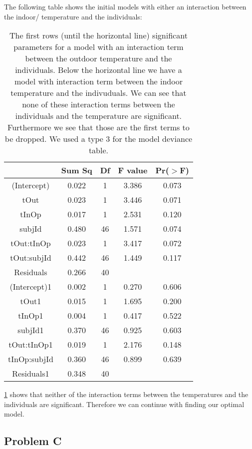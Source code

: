 \documentclass[
]{article}
\begin{document}
The following table shows the initial models with either an interaction
between the indoor/ temperature and the individuals:

\begin{table}[H]
\centering
\begin{tabular}{ccccc}
  \hline
 & Sum Sq & Df & F value & Pr($>$F) \\ 
  \hline
(Intercept) & 0.022 & 1 & 3.386 & 0.073 \\ 
  tOut & 0.023 & 1 & 3.446 & 0.071 \\ 
  tInOp & 0.017 & 1 & 2.531 & 0.120 \\ 
  subjId & 0.480 & 46 & 1.571 & 0.074 \\ 
  tOut:tInOp & 0.023 & 1 & 3.417 & 0.072 \\ 
  tOut:subjId & 0.442 & 46 & 1.449 & 0.117 \\ 
  Residuals & 0.266 & 40 &  &  \\ 
  \hline
  (Intercept)1 & 0.002 & 1 & 0.270 & 0.606 \\ 
  tOut1 & 0.015 & 1 & 1.695 & 0.200 \\ 
  tInOp1 & 0.004 & 1 & 0.417 & 0.522 \\ 
  subjId1 & 0.370 & 46 & 0.925 & 0.603 \\ 
  tOut:tInOp1 & 0.019 & 1 & 2.176 & 0.148 \\ 
  tInOp:subjId & 0.360 & 46 & 0.899 & 0.639 \\ 
  Residuals1 & 0.348 & 40 &  &  \\ 
   \hline
\end{tabular}
\caption{The first rows (until the horizontal line) significant parameters for a model with an interaction term between the outdoor temperature and the individuals. Below the horizontal line we have a model with interaction term between the indoor temperature and the indivuduals. We can see that none of these interaction terms between the individuals and the temperature are significant. Furthermore we see that those are the first terms to be dropped. We used a type 3 for the model deviance table.}
\label{tab:prob2_init}
\end{table}

\cref{tab:prob2_init} shows that neither of the interaction terms
between the temperatures and the individuals are significant. Therefore
we can continue with finding our optimal model.

\FloatBarrier

\hypertarget{problem-c}{%
\subsection{Problem C}\label{problem-c}}
\end{document}
